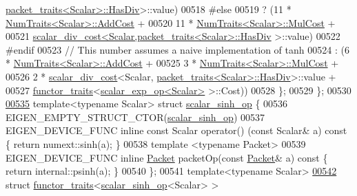\begin{DoxyCode}
      \hyperlink{struct_eigen_1_1internal_1_1packet__traits}{packet\_traits<Scalar>::HasDiv}>::value)
00518 \textcolor{preprocessor}{#else}
00519                 ? (11 * \hyperlink{group___core___module_struct_eigen_1_1_num_traits}{NumTraits<Scalar>::AddCost} +
00520                    11 * \hyperlink{group___core___module_struct_eigen_1_1_num_traits}{NumTraits<Scalar>::MulCost} +
00521                    \hyperlink{struct_eigen_1_1internal_1_1scalar__div__cost}{scalar\_div\_cost<Scalar,packet\_traits<Scalar>::HasDiv}
      >::value)
00522 #endif
00523                 \textcolor{comment}{// This number assumes a naive implementation of tanh}
00524                 : (6 * \hyperlink{group___core___module_struct_eigen_1_1_num_traits}{NumTraits<Scalar>::AddCost} +
00525                    3 * \hyperlink{group___core___module_struct_eigen_1_1_num_traits}{NumTraits<Scalar>::MulCost} +
00526                    2 * \hyperlink{struct_eigen_1_1internal_1_1scalar__div__cost}{scalar\_div\_cost}<Scalar,
      \hyperlink{struct_eigen_1_1internal_1_1packet__traits}{packet\_traits<Scalar>::HasDiv}>::value +
00527                    \hyperlink{struct_eigen_1_1internal_1_1functor__traits}{functor\_traits}<\hyperlink{struct_eigen_1_1internal_1_1scalar__exp__op}{scalar\_exp\_op<Scalar>} >::Cost))
00528   \};
00529 \};
00530 
\hyperlink{struct_eigen_1_1internal_1_1scalar__sinh__op}{00535} \textcolor{keyword}{template}<\textcolor{keyword}{typename} Scalar> \textcolor{keyword}{struct }\hyperlink{struct_eigen_1_1internal_1_1scalar__sinh__op}{scalar\_sinh\_op} \{
00536   EIGEN\_EMPTY\_STRUCT\_CTOR(\hyperlink{struct_eigen_1_1internal_1_1scalar__sinh__op}{scalar\_sinh\_op})
00537   EIGEN\_DEVICE\_FUNC \textcolor{keyword}{inline} \textcolor{keyword}{const} Scalar operator() (\textcolor{keyword}{const} Scalar& a)\textcolor{keyword}{ const }\{ \textcolor{keywordflow}{return} numext::sinh(a); \}
00538   \textcolor{keyword}{template} <\textcolor{keyword}{typename} Packet>
00539   EIGEN\_DEVICE\_FUNC \textcolor{keyword}{inline} \hyperlink{union_eigen_1_1internal_1_1_packet}{Packet} packetOp(\textcolor{keyword}{const} \hyperlink{union_eigen_1_1internal_1_1_packet}{Packet}& a)\textcolor{keyword}{ const }\{ \textcolor{keywordflow}{return} internal::psinh(a); 
      \}
00540 \};
00541 \textcolor{keyword}{template}<\textcolor{keyword}{typename} Scalar>
\hyperlink{struct_eigen_1_1internal_1_1functor__traits_3_01scalar__sinh__op_3_01_scalar_01_4_01_4}{00542} \textcolor{keyword}{struct }\hyperlink{struct_eigen_1_1internal_1_1functor__traits}{functor\_traits}<\hyperlink{struct_eigen_1_1internal_1_1scalar__sinh__op}{scalar\_sinh\_op}<Scalar> >

\end{DoxyCode}
